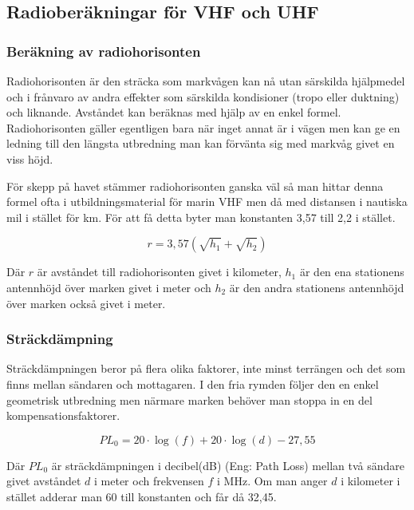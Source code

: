 
\subsection{Radioberäkningar för VHF och UHF}

\subsubsection{Beräkning av radiohorisonten}

Radiohorisonten är den sträcka som markvågen kan nå utan särskilda hjälpmedel och i frånvaro av andra effekter som särskilda kondisioner (tropo eller duktning) och liknande. Avståndet kan beräknas med hjälp av en enkel formel. Radiohorisonten gäller egentligen bara när inget annat är i vägen men kan ge en ledning till den längsta utbredning man kan förvänta sig med markvåg givet en viss höjd.

För skepp på havet stämmer radiohorisonten ganska väl så man hittar denna formel ofta i utbildningsmaterial för marin VHF men då med distansen i nautiska mil i stället för km. För att få detta byter man konstanten 3,57 till 2,2 i stället.

\begin{equation*}
	r = 3,57 \left(\sqrt{h_1}+\sqrt{h_2}\right)
\end{equation*}

Där $r$ är avståndet till radiohorisonten givet i kilometer, $h_1$ är den ena stationens antennhöjd över marken givet i meter och $h_2$ är den andra stationens antennhöjd över marken också givet i meter.

\subsubsection{Sträckdämpning}

Sträckdämpningen beror på flera olika faktorer, inte minst terrängen och det som finns mellan sändaren och mottagaren. I den fria rymden följer den en enkel geometrisk utbredning men närmare marken behöver man stoppa in en del kompensationsfaktorer.

\begin{equation*}
	PL_0 = 20 \cdot \log(f) + 20 \cdot \log(d) - 27,55
\end{equation*}

Där $PL_{0}$ är sträckdämpningen i decibel(dB) (Eng: Path Loss) mellan två sändare givet avståndet $d$ i meter och frekvensen $f$ i MHz. Om man anger $d$ i kilometer i stället adderar man 60 till konstanten och får då 32,45.

